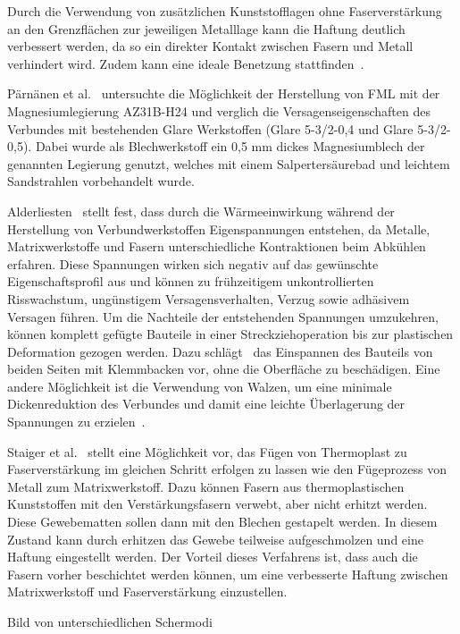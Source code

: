 Durch die Verwendung von zusätzlichen Kunststofflagen ohne Faserverstärkung an den Grenzflächen zur jeweiligen Metalllage kann die Haftung deutlich verbessert werden, da so ein direkter Kontakt zwischen Fasern und Metall verhindert wird.
Zudem kann eine ideale Benetzung stattfinden~\cite{Marissen1988}.

Pärnänen et al.~\cite{Paernaenen2012} untersuchte die Möglichkeit der Herstellung von FML mit der Magnesiumlegierung AZ31B-H24 und verglich die Versagenseigenschaften des Verbundes mit bestehenden Glare Werkstoffen (Glare 5-3/2-0,4 und Glare 5-3/2-0,5).
Dabei wurde als Blechwerkstoff ein 0,5 mm dickes Magnesiumblech der genannten Legierung genutzt, welches mit einem Salpertersäurebad und leichtem Sandstrahlen vorbehandelt wurde.

Alderliesten~\cite{Alderliesten2009} stellt fest, dass durch die Wärmeeinwirkung während der Herstellung von Verbundwerkstoffen Eigenspannungen entstehen, da Metalle, Matrixwerkstoffe und Fasern unterschiedliche Kontraktionen beim Abkühlen erfahren.
Diese Spannungen wirken sich negativ auf das gewünschte Eigenschaftsprofil aus und können zu frühzeitigem unkontrollierten Risswachstum, ungünstigem Versagensverhalten, Verzug sowie adhäsivem Versagen führen.
Um die Nachteile der entstehenden Spannungen umzukehren, können komplett gefügte Bauteile in einer Streckziehoperation bis zur plastischen Deformation gezogen werden.
Dazu schlägt~\cite{Delft.1} das Einspannen des Bauteils von beiden Seiten mit Klemmbacken vor, ohne die Oberfläche zu beschädigen.
Eine andere Möglichkeit ist die Verwendung von Walzen, um eine minimale Dickenreduktion des Verbundes und damit eine leichte Überlagerung der Spannungen zu erzielen~\cite{Vogelesang1989}.

Staiger et al.~\cite{Staiger2014} stellt eine Möglichkeit vor, das Fügen von Thermoplast zu Faserverstärkung im gleichen Schritt erfolgen zu lassen wie den Fügeprozess von Metall zum Matrixwerkstoff.
Dazu können Fasern aus thermoplastischen Kunststoffen mit den Verstärkungsfasern verwebt, aber nicht erhitzt werden.
Diese Gewebematten sollen dann mit den Blechen gestapelt werden.
In diesem Zustand kann durch erhitzen das Gewebe teilweise aufgeschmolzen und eine Haftung eingestellt werden.
Der Vorteil dieses Verfahrens ist, dass auch die Fasern vorher beschichtet werden können, um eine verbesserte Haftung zwischen Matrixwerkstoff und Faserverstärkung einzustellen.


Bild von unterschiedlichen Schermodi


